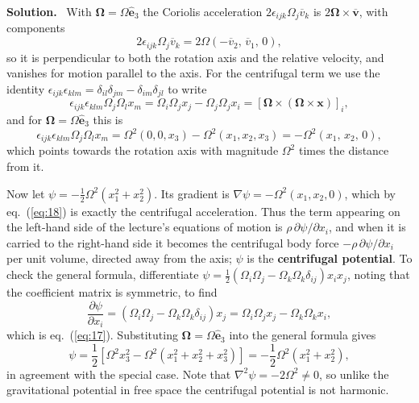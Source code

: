 \documentclass[a4paper,12pt]{paper}
\newenvironment{solution}{\par\noindent\textbf{Solution.}\ }{\par\medskip}
\begin{document}
\begin{solution}
With $\bm{\Omega}=\Omega\hat{\mathbf{e}}_{3}$ the Coriolis acceleration $2\epsilon_{ijk}\Omega_{j}\overline{v}_{k}$
is $2\bm{\Omega}\times\overline{\mathbf{v}}$, with components
\begin{equation}
2\epsilon_{ijk}\Omega_{j}\overline{v}_{k}=2\Omega\left(-\overline{v}_{2},\,\overline{v}_{1},\,0\right),
\label{eq:16}
\end{equation}
so it is perpendicular to both the rotation axis and the relative velocity, and vanishes for motion
parallel to the axis. For the centrifugal term we use the identity
$\epsilon_{ijk}\epsilon_{klm}=\delta_{il}\delta_{jm}-\delta_{im}\delta_{jl}$ to write
\begin{equation}
\epsilon_{ijk}\epsilon_{klm}\Omega_{j}\Omega_{l}x_{m}=\Omega_{i}\Omega_{j}x_{j}-\Omega_{j}\Omega_{j}x_{i}
=\left[\bm{\Omega}\times(\bm{\Omega}\times\mathbf{x})\right]_{i},
\label{eq:17}
\end{equation}
and for $\bm{\Omega}=\Omega\hat{\mathbf{e}}_{3}$ this is
\begin{equation}
\epsilon_{ijk}\epsilon_{klm}\Omega_{j}\Omega_{l}x_{m}=\Omega^{2}\left(0,0,x_{3}\right)-\Omega^{2}\left(x_{1},x_{2},x_{3}\right)
=-\Omega^{2}\left(x_{1},\,x_{2},\,0\right),
\label{eq:18}
\end{equation}
which points towards the rotation axis with magnitude $\Omega^{2}$ times the distance from it.

Now let $\psi=-\frac{1}{2}\Omega^{2}(x_{1}^{2}+x_{2}^{2})$. Its gradient is
$\nabla\psi=-\Omega^{2}(x_{1},x_{2},0)$, which by eq.~(\ref{eq:18}) is exactly the centrifugal
acceleration. Thus the term appearing on the left-hand side of the lecture's equations of motion is
$\rho\,\partial\psi/\partial x_{i}$, and when it is carried to the right-hand side it becomes the
centrifugal body force $-\rho\,\partial\psi/\partial x_{i}$ per unit volume, directed away from the axis;
$\psi$ is the \textbf{centrifugal potential}. To check the general formula, differentiate
$\psi=\frac{1}{2}(\Omega_{i}\Omega_{j}-\Omega_{k}\Omega_{k}\delta_{ij})x_{i}x_{j}$, noting that the
coefficient matrix is symmetric, to find
\begin{equation}
\frac{\partial\psi}{\partial x_{i}}=\left(\Omega_{i}\Omega_{j}-\Omega_{k}\Omega_{k}\delta_{ij}\right)x_{j}
=\Omega_{i}\Omega_{j}x_{j}-\Omega_{k}\Omega_{k}x_{i},
\label{eq:19}
\end{equation}
which is eq.~(\ref{eq:17}). Substituting $\bm{\Omega}=\Omega\hat{\mathbf{e}}_{3}$ into the general
formula gives
\begin{equation}
\psi=\frac{1}{2}\left[\Omega^{2}x_{3}^{2}-\Omega^{2}(x_{1}^{2}+x_{2}^{2}+x_{3}^{2})\right]
=-\frac{1}{2}\Omega^{2}(x_{1}^{2}+x_{2}^{2}),
\label{eq:20}
\end{equation}
in agreement with the special case. Note that
$\nabla^{2}\psi=-2\Omega^{2}\neq0$, so unlike the gravitational potential in free space the centrifugal
potential is not harmonic.


\end{solution}
\end{document}

